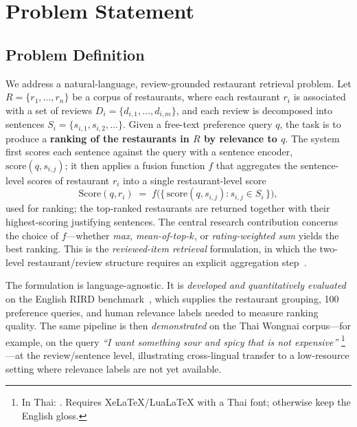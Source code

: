 \section{Problem Statement}

\subsection{Problem Definition}
We address a natural-language, review-grounded restaurant retrieval problem. Let
$R = \{r_1, \dots, r_n\}$ be a corpus of restaurants, where each restaurant $r_i$ is
associated with a set of reviews $D_i = \{d_{i,1}, \dots, d_{i,m}\}$, and each review is
decomposed into sentences $S_i = \{s_{i,1}, s_{i,2}, \dots\}$. Given a free-text
preference query $q$, the task is to produce a \textbf{ranking of the restaurants in
$R$ by relevance to $q$}. The system first scores each sentence against the query with a
sentence encoder, $\mathrm{score}(q, s_{i,j})$; it then applies a fusion function $f$
that aggregates the sentence-level scores of restaurant $r_i$ into a single
restaurant-level score
\[
  \mathrm{Score}(q, r_i) \;=\; f\big(\{\,\mathrm{score}(q, s_{i,j}) : s_{i,j} \in S_i\,\}\big),
\]
used for ranking; the top-ranked restaurants are returned together with their
highest-scoring justifying sentences. The central research contribution concerns the
choice of $f$---whether \emph{max}, \emph{mean-of-top-$k$}, or \emph{rating-weighted
sum} yields the best ranking. This is the \emph{reviewed-item retrieval} formulation, in
which the two-level restaurant/review structure requires an explicit aggregation
step~\cite{rird2023}.

The formulation is language-agnostic. It is \emph{developed and quantitatively
evaluated} on the English RIRD benchmark~\cite{rird2023}, which supplies the restaurant
grouping, 100 preference queries, and human relevance labels needed to measure ranking
quality. The same pipeline is then \emph{demonstrated} on the Thai Wongnai corpus---for
example, on the query \textit{``I want something sour and spicy that is not
expensive''}%
\footnote{In Thai: . Requires XeLaTeX/LuaLaTeX with a Thai font; otherwise keep the English gloss.}%
---at the review/sentence level, illustrating cross-lingual transfer to a low-resource
setting where relevance labels are not yet available.

